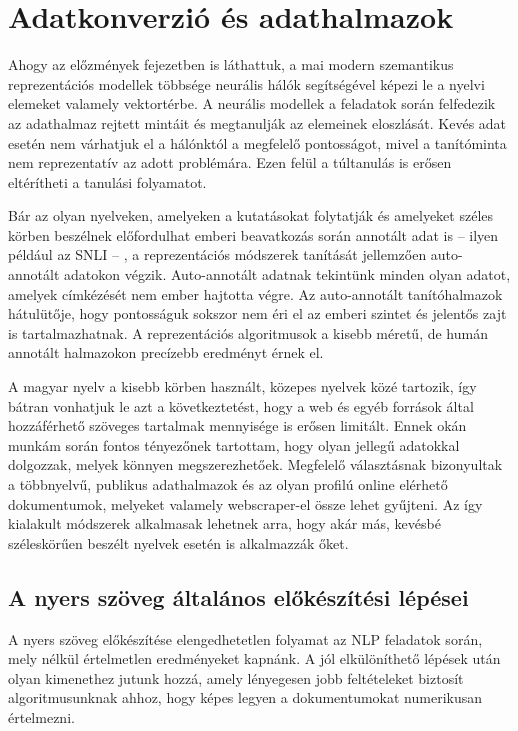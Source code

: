 \chapter{Adatkonverzió és adathalmazok}
\label{ch:datasets}

Ahogy az előzmények fejezetben is láthattuk, a mai modern szemantikus reprezentációs modellek többsége neurális hálók segítségével képezi le a nyelvi elemeket valamely vektortérbe. A neurális modellek a feladatok során felfedezik az adathalmaz rejtett mintáit és megtanulják az elemeinek eloszlását. Kevés adat esetén nem várhatjuk el a hálónktól a megfelelő pontosságot, mivel a tanítóminta nem reprezentatív az adott problémára. Ezen felül a túltanulás is erősen eltérítheti a tanulási folyamatot.

Bár az olyan nyelveken, amelyeken a kutatásokat folytatják és amelyeket széles körben beszélnek előfordulhat emberi beavatkozás során annotált adat is – ilyen például az SNLI – , a reprezentációs módszerek tanítását jellemzően auto-annotált adatokon végzik. Auto-annotált adatnak tekintünk minden olyan adatot, amelyek címkézését nem ember hajtotta végre. Az auto-annotált tanítóhalmazok hátulütője, hogy pontosságuk sokszor nem éri el az emberi szintet és jelentős zajt is tartalmazhatnak. A reprezentációs algoritmusok a kisebb méretű, de humán annotált halmazokon precízebb eredményt érnek el. \cite{infer}

A magyar nyelv a kisebb körben használt, közepes nyelvek közé tartozik, így bátran vonhatjuk le azt a következtetést, hogy a web és egyéb források által hozzáférhető szöveges tartalmak mennyisége is erősen limitált.
Ennek okán munkám során fontos tényezőnek tartottam, hogy olyan jellegű adatokkal dolgozzak, melyek könnyen megszerezhetőek. Megfelelő választásnak bizonyultak a többnyelvű, publikus adathalmazok és az olyan profilú online elérhető dokumentumok, melyeket valamely webscraper-el össze lehet gyűjteni. Az így kialakult módszerek alkalmasak lehetnek arra, hogy akár más, kevésbé széleskörűen beszélt nyelvek esetén is alkalmazzák őket.

\section{A nyers szöveg általános előkészítési lépései}

A nyers szöveg előkészítése elengedhetetlen folyamat az NLP feladatok során, mely nélkül értelmetlen eredményeket kapnánk. A jól elkülöníthető lépések után olyan kimenethez jutunk hozzá, amely lényegesen jobb feltételeket biztosít algoritmusunknak ahhoz, hogy képes legyen a dokumentumokat numerikusan értelmezni.

